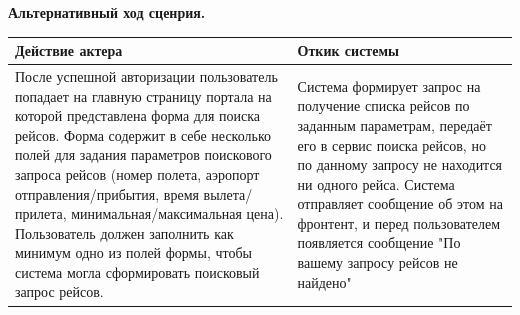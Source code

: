 \newpage

\textbf{Альтернативный ход сценрия.}
\begin{longtable}{|p{8cm}|p{8cm}|}
    \hline
    \textbf{Действие актера} & \textbf{Откик системы} \\
    \endhead

    \hline
    После успешной авторизации пользователь попадает на главную страницу портала на которой представлена форма для поиска рейсов. Форма содержит в себе несколько полей для задания параметров поискового запроса рейсов
    (номер полета, аэропорт отправления/прибытия, время вылета/прилета, минимальная/максимальная цена). Пользователь должен заполнить как минимум одно из полей формы, чтобы система могла сформировать поисковый запрос рейсов. &
    Система формирует запрос на получение списка рейсов по заданным параметрам, передаёт его в сервис поиска рейсов, но по данному запросу не находится ни одного рейса. Система отправляет сообщение об этом на фронтент, и перед пользователем появляется сообщение "По вашему запросу рейсов не найдено" \\
    \hline
\end{longtable}

\newpage

